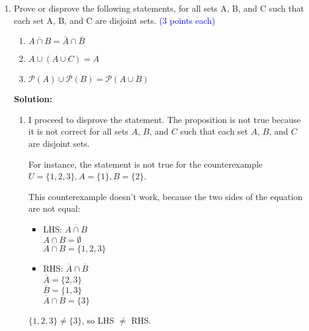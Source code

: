 \documentclass{article}
\newcommand{\pte}[1]{\textcolor{blue}{(#1 points each)}}
\newenvironment{solution}
{
\par
\color{blue}
\textbf{Solution:}
}
{
\par
}
\begin{document}
\begin{enumerate}
\begin{solution}
    $A \subset \mathcal{P(A)}$, so $A \in \mathcal{P(\mathcal{P(A))}}$
    
    \end{solution}

    \item Prove or disprove the following statements, for all sets A, B, and C such that each set A, B, and C are disjoint sets. \pte{3}
        \begin{enumerate}
            \item $\overline{A \cap B} = \bar{A} \cap \bar{B}$
            \item $A \cup (A \cup C) = A$
            \item $\mathcal{P}(A) \cup \mathcal{P}(B) = \mathcal{P}(A \cup B)$
        \end{enumerate}
    \begin{solution}
    \begin{enumerate}
        \item I proceed to disprove the statement. The proposition is not true because it is not correct for all sets $A$, $B$, and $C$ such that each set $A$, $B$, and $C$ are disjoint sets.
        
        For instance, the statement is not true for the counterexample $U = \{1, 2, 3\}, A = \{1\}, B = \{2\}$.
        
        This counterexample doesn't work, because the two sides of the equation are not equal:
        \begin{itemize}
            \item LHS: $\overline{A \cap B }$\\
            $A \cap B = \emptyset$ \\
            $\overline{A \cap B} = \{1, 2, 3\}$
            
            \item RHS: $\overline{A} \cap \overline{B}$\\
            $\overline{A} = \{2, 3\}$\\
            $\overline{B} = \{1, 3\}$\\
            $\overline{A} \cap \overline{B} = \{3\}$
        \end{itemize}
        
        $\{1, 2, 3\} \neq \{3\}$, so LHS $\neq$ RHS.
        

\end{enumerate}
\end{solution}
\end{enumerate}
\end{document}
